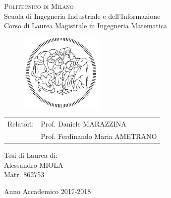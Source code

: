 \begin{titlepage}

	\begin{center}
		\normalsize 
			\textsc{Politecnico di Milano}\\
			Scuola di Ingegneria Industriale e dell'Informazione\\
      		Corso di Laurea Magistrale in Ingegneria Matematica\\
	\end{center}
	\vspace{.6cm}
	
	\begin{figure}[htpb]
		\centering
		\includegraphics[width=4cm]{Cover/polimi}
	\end{figure}
	\vspace{.6cm}
	
	\begin{center}
		\LARGE
			\textsc{}
	\end{center}
	\vspace{1.6cm}

	\begin{flushleft}
		\large
		\begin{tabular}{ll}
		Relatori:    & Prof. Daniele MARAZZINA      \\
		             & Prof. Ferdinando Maria AMETRANO
		\end{tabular}
		\vspace{1cm}
	\end{flushleft}
	
	\begin{flushright}
		\large
		Tesi di Laurea di:\\
		Alessandro MIOLA\\
		Matr. 862753\\		
	\end{flushright}
	
	\vspace*{\fill}
	\begin{center}
		Anno Accademico 2017-2018
	\end{center}
	
\end{titlepage}
